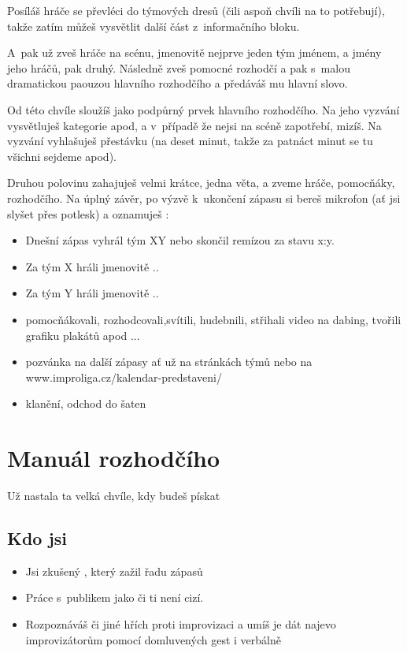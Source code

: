 Posíláš hráče se převléci do týmových dresů (čili aspoň chvíli na to potřebují), takže zatím můžeš vysvětlit další část z~informačního bloku. 
 
A~pak už zveš hráče na scénu, jmenovitě nejprve jeden tým jménem, a jmény jeho hráčů, pak druhý. 
Následně zveš pomocné rozhodčí a pak s~malou dramatickou paouzou hlavního rozhodčího a předáváš mu hlavní slovo. 
  
Od této chvíle sloužíš jako podpůrný prvek hlavního rozhodčího. Na jeho vyzvání vysvětluješ kategorie apod, a v~případě že nejsi na scéně zapotřebí, mizíš. 
Na vyzvání vyhlašuješ přestávku (na deset minut, takže za patnáct minut se tu všichni sejdeme apod). 
 
Druhou polovinu zahajuješ velmi krátce, jedna věta, a zveme hráče, pomocňáky, rozhodčího. 
Na úplný závěr, po výzvě k~ukončení zápasu si bereš mikrofon (ať jsi slyšet přes potlesk) a oznamuješ : 
 
\begin{itemize}
\item  Dnešní zápas vyhrál tým XY nebo skončil remízou za stavu x:y.
\item  Za tým X hráli jmenovitě ..
\item  Za tým Y hráli jmenovitě ..
\item  pomocňákovali, rozhodcovali,svítili, hudebnili, střihali video na dabing, tvořili grafiku plakátů apod ...
\item  pozvánka na další zápasy ať už na stránkách týmů nebo na www.improliga.cz/kalendar-predstaveni/
\item  klanění, odchod do šaten
\end{itemize}
\needspace{5cm} \section{Manuál rozhodčího} \label{manuál rozhodčího} Už nastala ta velká chvíle, kdy budeš pískat  
 
\subsection{ Kdo jsi } \begin{itemize}
\item  Jsi zkušený , který zažil řadu zápasů
\item  Práce s~publikem  jako  či  ti není cizí.
\item  Rozpoznáváš  či jiné hřích proti improvizaci a umíš je dát najevo improvizátorům pomocí domluvených gest i verbálně
\end{itemize}
 

